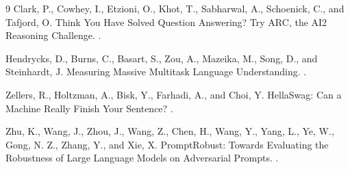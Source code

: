 \documentclass[11pt]{article}
\begin{document}
\begin{thebibliography}{9}
Clark, P., Cowhey, I., Etzioni, O., Khot, T., Sabharwal, A., Schoenick, C., and Tafjord, O.
\newblock Think You Have Solved Question Answering? Try ARC, the AI2 Reasoning Challenge.
.

Hendrycks, D., Burns, C., Basart, S., Zou, A., Mazeika, M., Song, D., and Steinhardt, J.
\newblock Measuring Massive Multitask Language Understanding.
.

Zellers, R., Holtzman, A., Bisk, Y., Farhadi, A., and Choi, Y.
\newblock HellaSwag: Can a Machine Really Finish Your Sentence?
.

Zhu, K., Wang, J., Zhou, J., Wang, Z., Chen, H., Wang, Y., Yang, L., Ye, W., Gong, N. Z., Zhang, Y., and Xie, X.
\newblock PromptRobust: Towards Evaluating the Robustness of Large Language Models on Adversarial Prompts.
.
\end{thebibliography}
\end{document}
